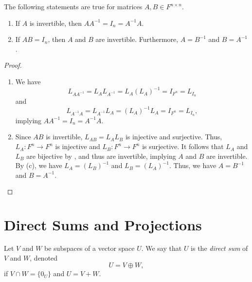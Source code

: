 \begin{proposition}
  \label{prop:invertible-matrix}
  The following statements are true for matrices $A, B \in F^{n \times n}$.
  \begin{enumerate}
    \item If $A$ is invertible, then $AA^{-1} = I_n = A^{-1}A$.
    \item If $AB = I_n$, then $A$ and $B$ are invertible.
    Furthermore, $A = B^{-1}$ and $B = A^{-1}$.
  \end{enumerate}
\end{proposition}
\begin{proof}
  \leavevmode
  \begin{enumerate}
    \item We have
    \begin{equation*}
      L_{AA^{-1}} = L_AL_{A^{-1}} = L_A(L_A)^{-1} = I_{F^n} = L_{I_n}
    \end{equation*}
    and
    \begin{equation*}
      L_{A^{-1}A} = L_{A^{-1}}L_A = (L_A)^{-1}L_A = I_{F^n} = L_{I_n},
    \end{equation*}
    implying $AA^{-1} = I_n = A^{-1}A$.
    
    \item Since $AB$ is invertible, $L_{AB} = L_AL_B$ is injective and
    surjective.
    Thus, ${L_A: F^n \to F^n}$ is injective and ${L_B: F^n \to F^n}$ is
    surjective.
    It follows that $L_A$ and $L_B$ are bijective by ,
    and thus are invertible, implying $A$ and $B$ are invertible.
    By  (c), we have $L_A = (L_B)^{-1}$ and
    $L_B = (L_A)^{-1}$.
    Thus, we have $A = B^{-1}$ and $B = A^{-1}$.
    \qedhere
  \end{enumerate}
\end{proof}

\section{Direct Sums and Projections}
\begin{definition}
  Let $V$ and $W$ be subspaces of a vector space $U$.
  We say that $U$ is the \emph{direct sum} of $V$ and $W$, denoted
  \begin{equation*}
    U = V \oplus W,
  \end{equation*}
  if $V \cap W = \{0_U\}$ and $U = V + W$.
\end{definition}

